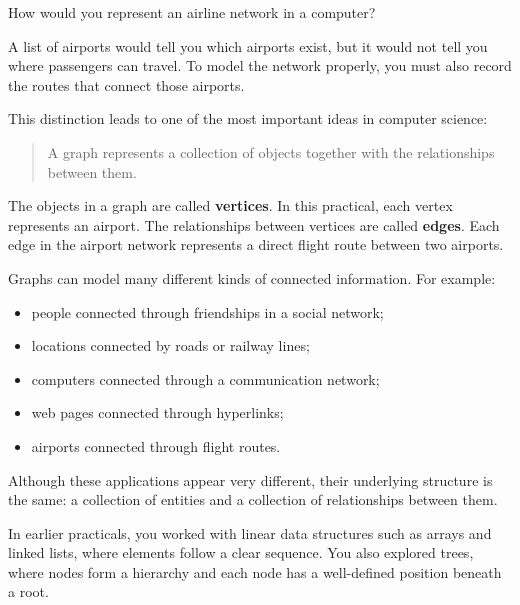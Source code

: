 \documentclass{csc2059practical}
\begin{document}
\maketitle

\tableofcontents
\clearpage




How would you represent an airline network in a computer?

A list of airports would tell you which airports exist, but it would not tell
you where passengers can travel. To model the network properly, you must also
record the routes that connect those airports.

This distinction leads to one of the most important ideas in computer science:

\begin{quote}
A graph represents a collection of objects together with the relationships
between them.
\end{quote}

The objects in a graph are called \textbf{vertices}. In this practical, each
vertex represents an airport. The relationships between vertices are called
\textbf{edges}. Each edge in the airport network represents a direct flight
route between two airports.

Graphs can model many different kinds of connected information. For example:

\begin{itemize}
\item people connected through friendships in a social network;
\item locations connected by roads or railway lines;
\item computers connected through a communication network;
\item web pages connected through hyperlinks;
\item airports connected through flight routes.
\end{itemize}

Although these applications appear very different, their underlying structure
is the same: a collection of entities and a collection of relationships between
them.

In earlier practicals, you worked with linear data structures such as arrays and
linked lists, where elements follow a clear sequence. You also explored trees,
where nodes form a hierarchy and each node has a well-defined position beneath
a root.
\end{document}
